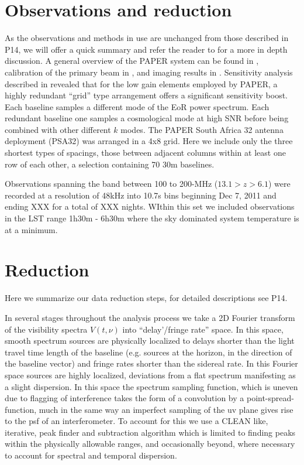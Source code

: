 \documentclass[preprint]{aastex}
\begin{document}

\section{Observations and reduction}
\label{sec:observations}
As the observations and methods in use are unchanged from those described in P14, we will offer a quick summary and refer the reader to \cite{Parsons:2013p9876} for a more in depth discussion.  A general overview of the PAPER system can be found in \cite{Parsons:2010p6757}, calibration of the primary beam in \cite{Pober:2012p8800}, and imaging results in \cite{Jacobs:2011p8438,Jacobs:2013p10014,Stefan:2013p9926}.  Sensitivity analysis described in \cite{Parsons:2012p9028} revealed that for the low gain elements employed by PAPER, a highly redundant ``grid'' type arrangement offers a significant sensitivity boost.  Each baseline samples a different mode of the EoR power spectrum. Each redundant baseline one samples a cosmological mode at high SNR before being combined with other different $k$ modes.  The PAPER South Africa 32 antenna deployment (PSA32) was arranged in a 4x8 grid.  Here we include only the three shortest types of spacings, those between adjacent columns within at least one row of each other, a selection containing 70 30m baselines.

Observations spanning the band between 100 to 200-MHz ($13.1>z>6.1$) were recorded at a resolution of 48kHz into 10.7s bins beginning Dec 7, 2011 and ending XXX for a total of XXX nights.  WIthin this set we included observations in the LST range 1h30m - 6h30m where the sky dominated system temperature is at a minimum.  


\section{Reduction}
\label{sec:obs_meth}
Here we summarize our data reduction steps, for detailed descriptions see P14.

In several stages throughout the analysis process we take a 2D Fourier transform of the visibility spectra $V(t,\nu)$ into ``delay'/fringe rate'' space.  In this space, smooth spectrum sources are physically localized to delays shorter than the light travel time length of the baseline (e.g. sources at the horizon, in the direction of the baseline vector) and fringe rates shorter than the sidereal rate.  In this Fourier space sources are highly localized, deviations from a flat spectrum manifesting as a slight dispersion. In this space the spectrum sampling function, which is uneven due to flagging of interference takes the form of a convolution by a point-spread-function, much in the same way an imperfect sampling of the uv plane gives rise to the psf of an interferometer.  To account for this we use a CLEAN like, iterative, peak finder and subtraction algorithm which is limited to finding peaks within the physically allowable ranges, and occasionally beyond, where necessary to account for spectral and temporal dispersion. 
\end{document}
